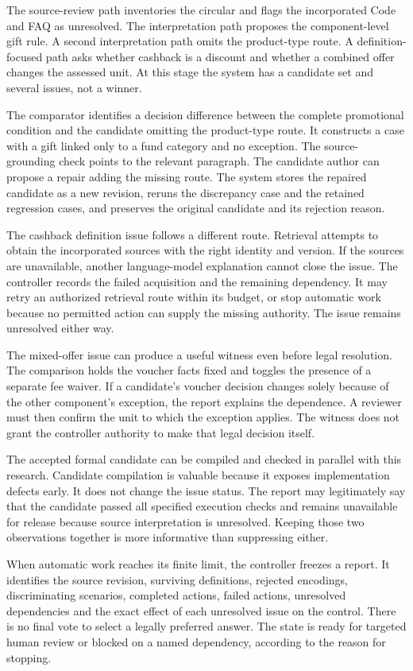 The source-review path inventories the circular and flags the incorporated Code
and FAQ as unresolved. The interpretation path proposes the component-level
gift rule. A second interpretation path omits the product-type route. A
definition-focused path asks whether cashback is a discount and whether a
combined offer changes the assessed unit. At this stage the system has a
candidate set and several issues, not a winner.

The comparator identifies a decision difference between the complete promotional
condition and the candidate omitting the product-type route. It constructs a
case with a gift linked only to a fund category and no exception. The
source-grounding check points to the relevant paragraph. The candidate author
can propose a repair adding the missing route. The system stores the repaired
candidate as a new revision, reruns the discrepancy case and the retained
regression cases, and preserves the original candidate and its rejection reason.

The cashback definition issue follows a different route. Retrieval attempts to
obtain the incorporated sources with the right identity and version. If the
sources are unavailable, another language-model explanation cannot close the
issue. The controller records the failed acquisition and the remaining
dependency. It may retry an authorized retrieval route within its budget, or
stop automatic work because no permitted action can supply the missing
authority. The issue remains unresolved either way.

The mixed-offer issue can produce a useful witness even before legal resolution.
The comparison holds the voucher facts fixed and toggles the presence of a
separate fee waiver. If a candidate's voucher decision changes solely because
of the other component's exception, the report explains the dependence. A
reviewer must then confirm the unit to which the exception applies. The witness
does not grant the controller authority to make that legal decision itself.

The accepted formal candidate can be compiled and checked in parallel with this
research. Candidate compilation is valuable because it exposes implementation
defects early. It does not change the issue status. The report may legitimately
say that the candidate passed all specified execution checks and remains
unavailable for release because source interpretation is unresolved. Keeping
those two observations together is more informative than suppressing either.

When automatic work reaches its finite limit, the controller freezes a report.
It identifies the source revision, surviving definitions, rejected encodings,
discriminating scenarios, completed actions, failed actions, unresolved
dependencies and the exact effect of each unresolved issue on the control.
There is no final vote to select a legally preferred answer. The state is ready
for targeted human review or blocked on a named dependency, according to the
reason for stopping.

